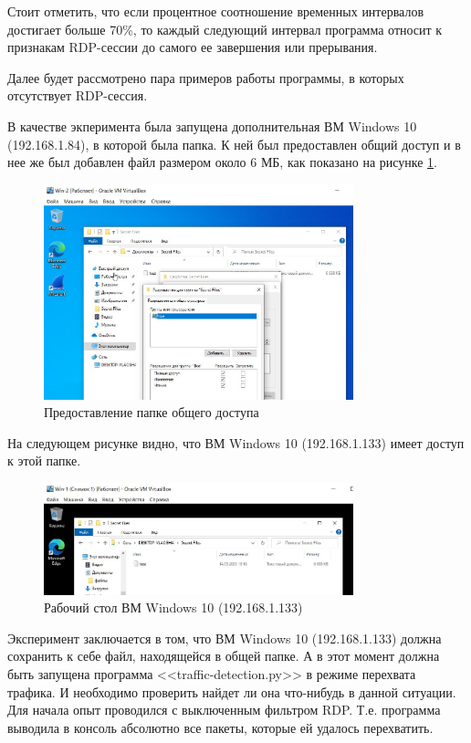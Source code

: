 \documentclass[bachelor, och, coursework]{SCWorks}
\begin{document}
Стоит отметить, что если процентное соотношение временных интервалов достигает больше 70\%, то каждый следующий интервал программа
относит к признакам RDP-сессии до самого ее завершения или прерывания.

Далее будет рассмотрено пара примеров работы программы, в которых отсутствует RDP-сессия.

В качестве экперимента была запущена дополнительная ВМ Windows 10 (192.168.1.84), в которой была папка. К ней был предоставлен
общий доступ и в нее же был добавлен файл размером около 6 МБ, как показано
на рисунке \ref{smb-win1}.

\begin{figure}[H]
  \centering
  \includegraphics[width=0.8\textwidth]{photo/smb-win1.jpg}
  \caption{Предоставление папке общего доступа}
  \label{smb-win1}
\end{figure}

На следующем рисунке видно, что ВМ Windows 10 (192.168.1.133) имеет доступ к этой папке.

\begin{figure}[H]
  \centering
  \includegraphics[width=0.8\textwidth]{photo/smb-win2.jpg}
  \caption{Рабочий стол ВМ Windows 10 (192.168.1.133)}
  \label{smb-win2}
\end{figure}

Эксперимент заключается в том, что ВМ Windows 10 (192.168.1.133) должна сохранить к себе файл, находящейся в общей папке.
А в этот момент должна быть запущена программа <<traffic-detection.py>> в режиме перехвата трафика. И необходимо проверить
найдет ли она что-нибудь в данной ситуации. Для начала опыт проводился с выключенным фильтром RDP. Т.е. программа выводила в
консоль абсолютно все пакеты, которые ей удалось перехватить.
\end{document}
